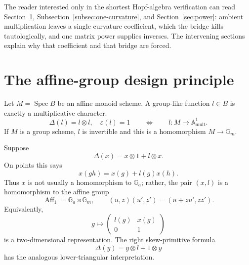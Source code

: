 \documentclass[11pt]{amsart}
\theoremstyle{definition}
\theoremstyle{remark}
\newcommand{\Ga}{\mathbb G_a}
\newcommand{\Gm}{\mathbb G_m}
\newcommand{\Spec}{\operatorname{Spec}}
\newcommand{\eps}{\varepsilon}
\newcommand{\ot}{\otimes}
\begin{document}
The reader interested only in the shortest Hopf-algebra verification can
read Section~\ref{sec:design}, Subsection~\ref{subsec:one-curvature}, and
Section~\ref{sec:power}: ambient multiplication leaves a single curvature
coefficient, which the bridge kills tautologically, and one matrix power
supplies inverses.
The intervening sections explain why that coefficient and that bridge are
forced.

\section{The affine-group design principle}
\label{sec:design}

Let \(M=\Spec B\) be an affine monoid scheme.  A group-like function
\(l\in B\) is exactly a multiplicative character:
\[
 \Delta(l)=l\ot l,\quad\eps(l)=1
 \qquad\Longleftrightarrow\qquad
 l\colon M\longrightarrow\mathbb A^1_{\mathrm{mult}}.
\]
If \(M\) is a group scheme, \(l\) is invertible and this is a homomorphism
\(M\to\Gm\).

Suppose
\[
 \Delta(x)=x\ot1+l\ot x.
\]
On points this says
\[
 x(gh)=x(g)+l(g)x(h).
\]
Thus \(x\) is not usually a homomorphism to \(\Ga\); rather, the pair
\((x,l)\) is a homomorphism to the affine group
\[
 \operatorname{Aff}_1=\Ga\rtimes\Gm,\qquad
 (u,z)(u',z')=(u+zu',zz').
\]
Equivalently,
\[
 g\longmapsto
 \begin{pmatrix}l(g)&x(g)\\0&1\end{pmatrix}
\]
is a two-dimensional representation.  The right skew-primitive formula
\[
 \Delta(y)=y\ot l+1\ot y
\]
has the analogous lower-triangular interpretation.
\end{document}
